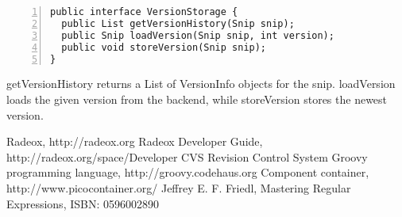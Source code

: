 \documentclass[a4paper,pdftex]{article}
\begin{document}
\begin{Verbatim}[gobble=0,frame=single,numbers=left,fontsize=\small]
public interface VersionStorage {
  public List getVersionHistory(Snip snip);
  public Snip loadVersion(Snip snip, int version);
  public void storeVersion(Snip snip);
}
\end{Verbatim}

getVersionHistory returns a List of VersionInfo objects for the snip. loadVersion loads the given
version from the backend, while storeVersion stores the newest version.




\begin{thebibliography}{}
 Radeox,  http://radeox.org
 Radeox Developer Guide, http://radeox.org/space/Developer
 CVS Revision Control System
 Groovy programming language, http://groovy.codehaus.org
 Component container, http://www.picocontainer.org/
 Jeffrey E. F. Friedl, Mastering Regular Expressions, ISBN: 0596002890
\end{thebibliography}
\end{document}
